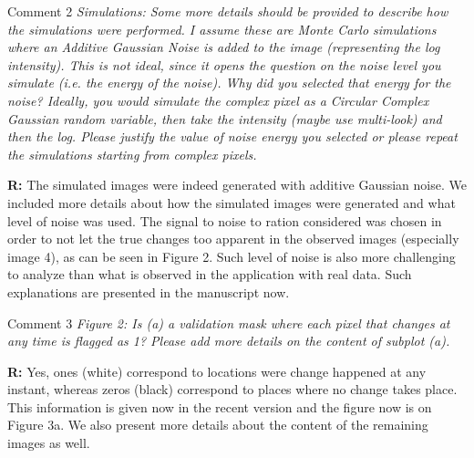 \documentclass[11pt]{report}
\begin{document}
\medskip
\begin{mybox}{Comment 2}
\textit{Simulations: Some more details should be provided to describe how the simulations were performed. I assume these are Monte Carlo simulations where an Additive Gaussian Noise is added to the image (representing
the log intensity). This is not ideal, since it opens the question on the noise level you simulate (i.e. the energy
of the noise). Why did you selected that energy for the noise? Ideally, you would simulate the complex pixel
as a Circular Complex Gaussian random variable, then take the intensity (maybe use multi-look) and then the
log. Please justify the value of noise energy you selected or please repeat the simulations starting from complex
pixels.}


\medskip
\textbf{R:} The simulated images were indeed generated with additive Gaussian noise. We included more details about how the simulated images were generated and what level of noise was used. The signal to noise to ration considered was chosen in order to not let the true changes too apparent in the observed images (especially image 4), as can be seen in Figure 2. Such level of noise is also more challenging to analyze than what is observed in the application with real data. Such explanations are presented in the manuscript now.   
\end{mybox}

\medskip
\begin{mybox}{Comment 3}
\textit{Figure 2: Is (a) a validation mask where each pixel that changes at any time is flagged as 1? Please add
more details on the content of subplot (a).}


\medskip
\textbf{R:} Yes, ones (white) correspond to locations were change happened at any instant, whereas zeros (black) correspond to places where no change takes place.  This information is given now in the recent version and the figure now is on Figure 3a. We also present more details about the content of the remaining images as well.
\end{mybox}
\end{document}

